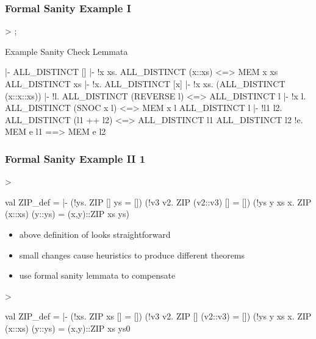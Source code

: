 \begin{frame}[fragile]
\frametitle{Formal Sanity Example I}

\begin{semiverbatim}\scriptsize
> ;
\end{semiverbatim}

\begin{block}{Example Sanity Check Lemmata}
\begin{semiverbatim}\scriptsize
|- ALL_DISTINCT []\smallskip
|- !x xs. ALL_DISTINCT (x::xs) <=> \holNeg{}MEM x xs \holAnd{} ALL_DISTINCT xs\smallskip
|- !x. ALL_DISTINCT [x]\smallskip
|- !x xs. \holNeg{}(ALL_DISTINCT (x::x::xs))\smallskip
|- !l. ALL_DISTINCT (REVERSE l) <=> ALL_DISTINCT l\smallskip
|- !x l. ALL_DISTINCT (SNOC x l) <=> \holNeg{}MEM x l \holAnd{} ALL_DISTINCT l\smallskip
|- !l1 l2. ALL_DISTINCT (l1 ++ l2) <=>
           ALL_DISTINCT l1 \holAnd{} ALL_DISTINCT l2 \holAnd{} !e. MEM e l1 ==> \holNeg{}MEM e l2
\end{semiverbatim}
\end{block}
\end{frame}


\begin{frame}[fragile]
\frametitle{Formal Sanity Example II 1}

\begin{semiverbatim}\scriptsize
> 

val ZIP_def =
 |- (!ys. ZIP [] ys = []) \holAnd{} (!v3 v2. ZIP (v2::v3) [] = []) \holAnd{}
    (!ys y xs x. ZIP (x::xs) (y::ys) = (x,y)::ZIP xs ys)
\end{semiverbatim}\vspace{-1em}
\begin{itemize}
\item above definition of  looks straightforward
\item small changes cause heuristics to produce different theorems
\item use formal sanity lemmata to compensate
\end{itemize}
\begin{semiverbatim}\scriptsize
> 

val ZIP_def =
   |- (!xs. ZIP xs [] = []) \holAnd{} (!v3 v2. ZIP [] (v2::v3) = []) \holAnd{}
      (!ys y xs x. ZIP (x::xs) (y::ys) = (x,y)::ZIP xs ys0
\end{semiverbatim}
\end{frame}


